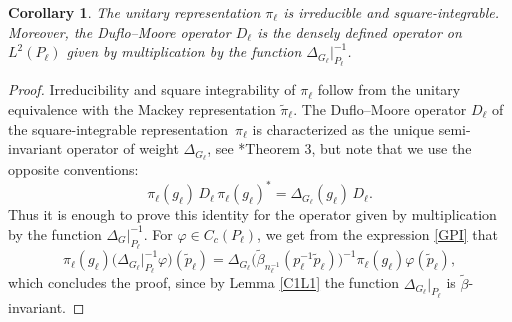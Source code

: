 \documentclass[a4paper,11pt,reqno]{amsart}
\numberwithin{equation}{section}
\newtheorem{corollary}[theorem]{Corollary}
\theoremstyle{remark}
\theoremstyle{definition}
\newcommand{\vf}{\varphi}
\begin{document}
\begin{corollary}
\label{DMC}
The unitary representation $\pi_\ell$ is irreducible and square-integrable. Moreover, the Duflo--Moore operator $D_\ell$ is the densely defined operator on $L^2(P_\ell)$ given by multiplication
by the function $\Delta_{G_\ell}\big|_{P_\ell}^{-1}$.
\end{corollary}
\begin{proof}
Irreducibility and square integrability of $\pi_\ell$ follow from the unitary equivalence with the  Mackey representation $\tilde\pi_\ell$.
The Duflo--Moore operator $D_\ell$ of the square-integrable representation~$\pi_\ell$
is characterized as  the unique semi-invariant operator of weight $\Delta_{G_\ell}$, see \cite{DM}*{Theorem 3}, but note that we use the opposite conventions:
$$
\pi_\ell(g_\ell)\,D_\ell\,\pi_\ell(g_\ell)^*=\Delta_{G_\ell}(g_\ell)\,D_\ell.
$$
Thus it is enough to prove this identity for the operator given by multiplication by the function $\Delta_G\big|_{P_\ell}^{-1}$. For $\vf\in C_c(P_\ell)$, we get from
the expression \eqref{GPI} that
$$
\pi_\ell(g_\ell)\big(\Delta_{G_\ell}\big|_{P_\ell}^{-1}\vf\big)(\tilde p_\ell)=\Delta_{G_\ell}\big(\tilde\beta_{n_{\ell}^{-1}}(p_\ell^{-1}\tilde p_\ell)\big)^{-1}\pi_\ell(g_\ell)\vf(\tilde p_\ell),
$$
which concludes the proof, since by Lemma \ref{C1L1} the function $\Delta_{G_\ell}\big|_{P_\ell}$ is $\tilde\beta$-invariant.
\end{proof}
\end{document}
